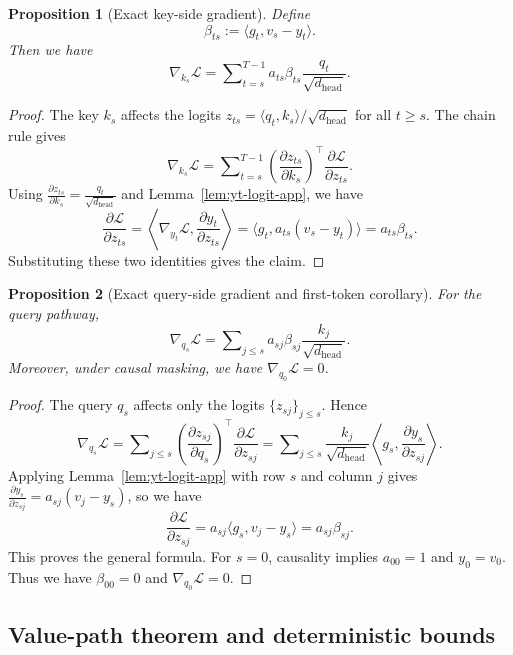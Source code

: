 \documentclass{article}
\theoremstyle{plain}
\newtheorem{proposition}{Proposition}
\theoremstyle{definition}
\theoremstyle{remark}
\begin{document}
\begin{proposition}[Exact key-side gradient]\label{prop:k-exact-app}
Define
\[
    \beta_{ts} := \langle g_t, v_s - y_t \rangle.
\]
Then we have
\[
    \nabla_{k_s} \mathcal{L} = \sum\nolimits_{t=s}^{T-1} a_{ts} \beta_{ts} \frac{q_t}{\sqrt{d_{\mathrm{head}}}}.
\]
\end{proposition}
\begin{proof}
The key $k_s$ affects the logits $z_{ts} = \langle q_t, k_s \rangle / \sqrt{d_{\mathrm{head}}}$ for all $t \ge s$. The chain rule gives
\[
    \nabla_{k_s} \mathcal{L}
    = \sum\nolimits_{t=s}^{T-1} \left(\frac{\partial z_{ts}}{\partial k_s}\right)^\top \frac{\partial \mathcal{L}}{\partial z_{ts}}.
\]
Using $\frac{\partial z_{ts}}{\partial k_s} = \frac{q_t}{\sqrt{d_{\mathrm{head}}}}$ and Lemma~\ref{lem:yt-logit-app}, we have
\[
    \frac{\partial \mathcal{L}}{\partial z_{ts}}
    = \left\langle \nabla_{y_t} \mathcal{L}, \frac{\partial y_t}{\partial z_{ts}} \right\rangle
    = \langle g_t, a_{ts}(v_s - y_t) \rangle
    = a_{ts} \beta_{ts}.
\]
Substituting these two identities gives the claim.
\end{proof}

\begin{proposition}[Exact query-side gradient and first-token corollary]\label{prop:q-exact-app}
For the query pathway,
\[
    \nabla_{q_s} \mathcal{L} = \sum\nolimits_{j \le s} a_{sj} \beta_{sj} \frac{k_j}{\sqrt{d_{\mathrm{head}}}}.
\]
Moreover, under causal masking, we have $\nabla_{q_0}\mathcal{L} = 0$.
\end{proposition}
\begin{proof}
The query $q_s$ affects only the logits $\{z_{sj}\}_{j \le s}$. Hence
\[
    \nabla_{q_s} \mathcal{L}
    = \sum\nolimits_{j \le s} \left(\frac{\partial z_{sj}}{\partial q_s}\right)^\top \frac{\partial \mathcal{L}}{\partial z_{sj}}
    = \sum\nolimits_{j \le s} \frac{k_j}{\sqrt{d_{\mathrm{head}}}} \left\langle g_s, \frac{\partial y_s}{\partial z_{sj}} \right\rangle.
\]
Applying Lemma~\ref{lem:yt-logit-app} with row $s$ and column $j$ gives $\frac{\partial y_s}{\partial z_{sj}} = a_{sj}(v_j - y_s)$, so we have
\[
    \frac{\partial \mathcal{L}}{\partial z_{sj}} = a_{sj} \langle g_s, v_j - y_s \rangle = a_{sj} \beta_{sj}.
\]
This proves the general formula.
For $s=0$, causality implies $a_{00}=1$ and $y_0=v_0$. Thus we have $\beta_{00}=0$ and $\nabla_{q_0} \mathcal{L}=0$.
\end{proof}

\subsection{Value-path theorem and deterministic bounds}\label{app:theory:vside}
\end{document}
